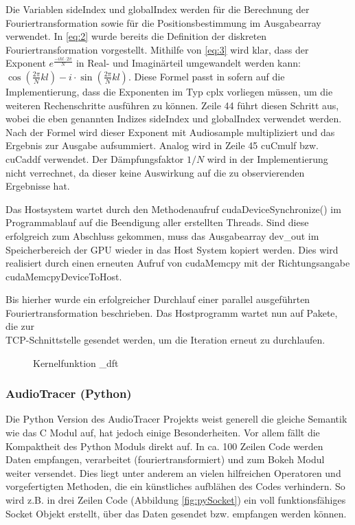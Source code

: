 Die Variablen sideIndex und globalIndex werden für die Berechnung der Fouriertransformation sowie für die Positionsbestimmung im Ausgabearray verwendet.
In \eqref{eq:2} wurde bereits die Definition der diskreten Fouriertransformation vorgestellt. Mithilfe von \eqref{eq:3} wird klar, dass der Exponent $e^{\frac{-ikl\cdot 2\pi}{N}}$ in Real- und Imaginärteil umgewandelt werden kann: $\cos(\frac{2\pi}{N}kl) - i \cdot \sin(\frac{2\pi}{N}kl)$. Diese Formel passt in sofern auf die Implementierung, dass die Exponenten im Typ cplx vorliegen müssen, um die weiteren Rechenschritte ausführen zu können. Zeile 44 führt diesen Schritt aus, wobei die eben genannten Indizes sideIndex und globalIndex verwendet werden. Nach der Formel wird dieser Exponent mit Audiosample multipliziert und das Ergebnis zur Ausgabe aufsummiert. Analog wird in Zeile 45 cuCmulf bzw. cuCaddf verwendet. Der Dämpfungsfaktor $1/N$ wird in der Implementierung nicht verrechnet, da dieser keine Auswirkung auf die zu observierenden Ergebnisse hat.

Das Hostsystem wartet durch den Methodenaufruf cudaDeviceSynchronize() im Programmablauf auf die Beendigung aller erstellten Threads. Sind diese erfolgreich zum Abschluss gekommen, muss das Ausgabearray dev\_out im Speicherbereich der GPU wieder in das Host System kopiert werden. Dies wird realisiert durch einen erneuten Aufruf von cudaMemcpy mit der Richtungsangabe cudaMemcpyDeviceToHost.

Bis hierher wurde ein erfolgreicher Durchlauf einer parallel ausgeführten Fouriertransformation beschrieben. Das Hostprogramm wartet nun auf Pakete, die zur \\TCP-Schnittstelle gesendet werden, um die Iteration erneut zu durchlaufen.

\begin{figure}[h!]
	
	\caption{Kernelfunktion \_dft}
	\label{fig:devicedft}
\end{figure}

\newpage
\subsubsection{AudioTracer (Python)}
Die Python Version des AudioTracer Projekts weist generell die gleiche Semantik wie das C Modul auf, hat jedoch einige Besonderheiten. Vor allem fällt die Kompaktheit des Python Moduls direkt auf. In ca. 100 Zeilen Code werden Daten empfangen, verarbeitet (fouriertransformiert) und zum Bokeh Modul weiter versendet. Dies liegt unter anderem an vielen hilfreichen Operatoren und vorgefertigten Methoden, die ein künstliches aufblähen des Codes verhindern. So wird z.B. in drei Zeilen Code (Abbildung \ref{fig:pySocket}) ein voll funktionsfähiges Socket Objekt erstellt, über das Daten gesendet bzw. empfangen werden können. 

